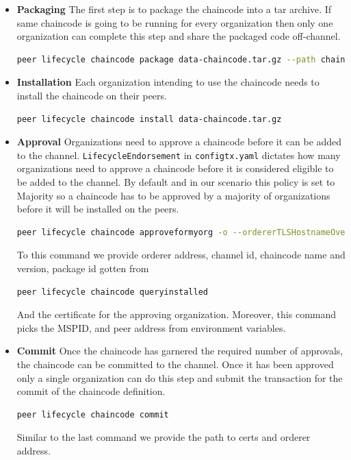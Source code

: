 \begin{itemize}
    \item \textbf{Packaging} The first step is to package the chaincode into a tar archive. If same chaincode is going to be running for every organization then only one organization can complete this step and share the packaged code off-channel. 
    \begin{lstlisting}[language=bash]
        peer lifecycle chaincode package data-chaincode.tar.gz --path chaincode/ --lang node --label data-chaincode-1\end{lstlisting}

    \item \textbf{Installation} Each organization intending to use the chaincode needs to install the chaincode on their peers.
    \begin{lstlisting}[language=bash]
    peer lifecycle chaincode install data-chaincode.tar.gz\end{lstlisting}
    
    \item \textbf{Approval} Organizations need to approve a chaincode before it can be added to the channel. \lstinline{LifecycleEndorsement} in \lstinline{configtx.yaml} dictates how many organizations need to approve a chaincode before it is considered eligible to be added to the channel. By default and in our scenario this policy is set to Majority so a chaincode has to be approved by a majority of organizations before it will be installed on the peers.
    \begin{lstlisting}[language=bash]
    peer lifecycle chaincode approveformyorg -o --ordererTLSHostnameOverride --channelID --name  --version 1.0 --package-id --sequence --tls --cafile\end{lstlisting}
    
    To this command we provide orderer address, channel id, chaincode name and version, package id gotten from 
    \begin{lstlisting}[language=bash]
    peer lifecycle chaincode queryinstalled \end{lstlisting}
    
    And the certificate for the approving organization. Moreover, this command picks the MSPID, and peer address from environment variables.
    
    \item \textbf{Commit} Once the chaincode has garnered the required number of approvals, the chaincode can be committed to the channel. Once it has been approved only a single organization can do this step and submit the transaction for the commit of the chaincode definition.
    \begin{lstlisting}[language=bash]
    peer lifecycle chaincode commit\end{lstlisting}
    
    Similar to the last command we provide the path to certs and orderer address.
\end{itemize}

